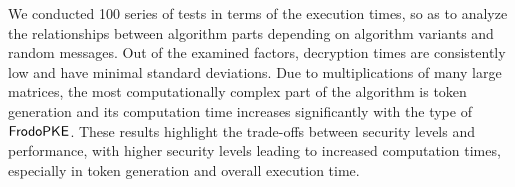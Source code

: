 \documentclass{fundam}
\begin{document}
 We conducted 100 series of tests in terms of the execution times,  so as to analyze the relationships between algorithm parts depending on algorithm variants and random messages. Out of the examined factors, decryption times are consistently low and have minimal standard deviations. Due to multiplications of many large matrices, the most computationally complex part of the algorithm is token generation and its computation time increases significantly with the type of $\mathsf{FrodoPKE}$. These results highlight the trade-offs between security levels and performance, with higher security levels leading to increased computation times, especially in token generation and overall execution time.


\nocite{*}



\end{document}
